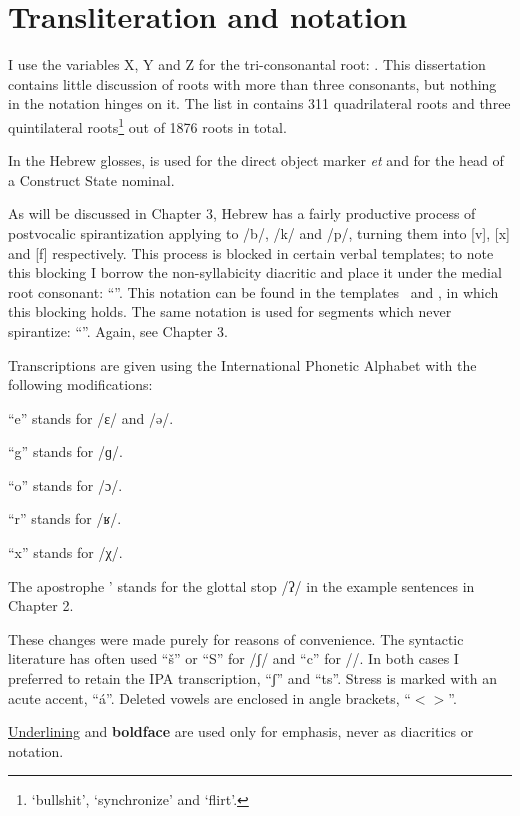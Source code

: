 \section{Transliteration and notation} \label{sec:data:notation}
I use the variables X, Y and Z for the tri-consonantal root: . This dissertation contains little discussion of roots with more than three consonants, but nothing in the notation hinges on it. The list in \cite{ehrenfeld12} contains 311 quadrilateral roots and three quintilateral roots\footnote{ `bullshit',  `synchronize' and  `flirt'.} out of 1876 roots in total.

In the Hebrew glosses,  is used for the direct object marker \emph{et} and  for the head of a Construct State nominal.

As will be discussed in Chapter 3, Hebrew has a fairly productive process of postvocalic spirantization applying to /b/, /k/ and /p/, turning them into [v], [x] and [f] respectively. This process is blocked in certain verbal templates; to note this blocking I borrow the non-syllabicity diacritic and place it under the medial root consonant: ``''. This notation can be found in the templates \tpie~and \thit, in which this blocking holds. The same notation is used for segments which never spirantize: ``''. Again, see Chapter 3.

Transcriptions are given using the International Phonetic Alphabet with the following modifications:
\begin{itemize*}
	\item ``e'' stands for /ɛ/ and /ə/.
	\item ``g'' stands for /ɡ/.
	\item ``o'' stands for /ɔ/.
	\item ``r'' stands for /ʁ/.
	\item ``x'' stands for /χ/.
	\item The apostrophe ' stands for the glottal stop /ʔ/ in the example sentences in Chapter 2.
\end{itemize*}
These changes were made purely for reasons of convenience. The syntactic literature has often used ``\v{s}'' or ``S'' for /ʃ/ and ``c'' for /\texttslig/. In both cases I preferred to retain the IPA transcription, ``ʃ'' and ``ts''. Stress is marked with an acute accent, ``\'a''. Deleted vowels are enclosed in angle brackets, ``$<>$''.

\underline{Underlining} and \textbf{boldface} are used only for emphasis, never as diacritics or notation.

